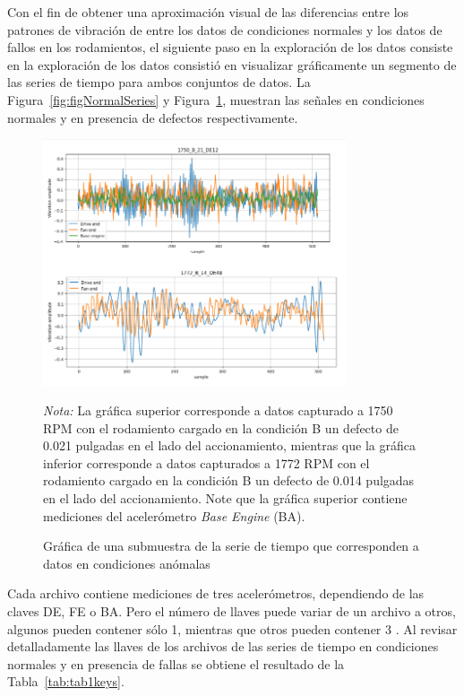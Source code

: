 \documentclass[11pt,a4paper,spanish]{book}
\numberwithin{equation}{chapter}
\numberwithin{figure}{chapter}
\begin{document}
Con el fin de obtener una aproximación visual de las diferencias entre los patrones de 
vibración de entre los datos de condiciones normales y los datos de fallos en los 
rodamientos, el siguiente paso en la exploración de los datos consiste en la exploración 
de los datos consistió en visualizar gráficamente un segmento de las series de tiempo 
para ambos conjuntos de datos. La Figura~\ref{fig:figNormalSeries} y 
Figura~\ref{fig:figAnomalySeries}, muestran las señales en condiciones normales y en 
presencia de defectos respectivamente. 


\begin{figure}[h]
    \caption{Gráfica de una submuestra de la serie de tiempo que corresponden a datos en 
    condiciones anómalas}
    \centering
    \includegraphics[width=0.8\textwidth]{media/dataset/anomaly-series.png}
    \label{fig:figAnomalySeries}
    \parbox{\textwidth}{\footnotesize \textit{Nota:} La gráfica superior corresponde a datos
    capturado a 1750 RPM con el rodamiento cargado en la condición B un 
    defecto de 0.021 pulgadas en el lado del accionamiento, mientras que la gráfica inferior
    corresponde a datos capturados a 1772 RPM con 
    el rodamiento cargado en la condición B un defecto de 0.014 pulgadas en el lado del 
    accionamiento. Note que la gráfica superior contiene mediciones del acelerómetro 
    \textit{Base Engine} (BA). }
\end{figure}


Cada archivo contiene mediciones de tres acelerómetros, dependiendo de las claves DE, 
FE o BA. Pero el número de llaves puede variar de un archivo a otros, algunos pueden 
contener sólo 1, mientras que otros pueden contener 3 \cite{rigas2024marine}. 
Al revisar detalladamente las llaves de los archivos de las series de tiempo en 
condiciones normales y en presencia de fallas  se obtiene el resultado de la 
Tabla~\ref{tab:tab1keys}. 
\end{document}
